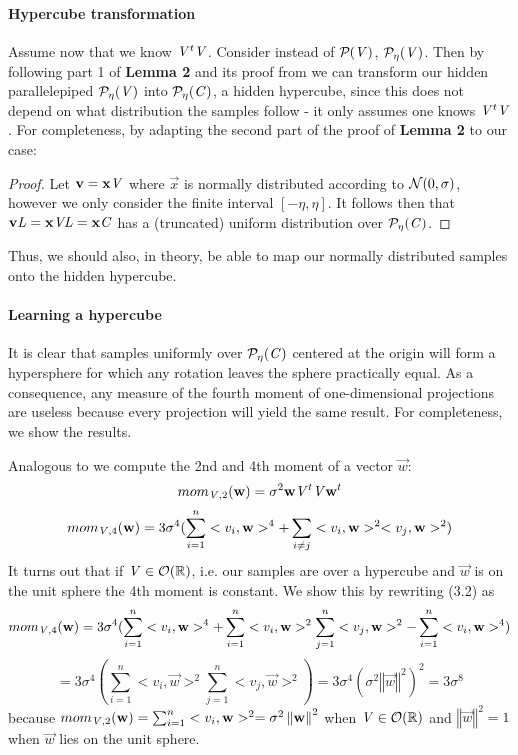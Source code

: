 \paragraph{Hypercube transformation}
Assume now that we know $\mat{V}^t \mat{V}$. Consider instead of $\PP{V}$, $\PP[\eta]{V}$.
Then by following part 1 of \textbf{Lemma 2} and its proof from \cite{NR09} we can transform our hidden parallelepiped $\PP[\eta]{V}$ into $\PP[\eta]{C}$, a hidden hypercube,
since this does not depend on what distribution the samples follow - it only assumes one knows $\mat{V}^t\mat{V}$.
For completeness, by adapting the second part of the proof of \textbf{Lemma 2} to our case: 
\begin{proof}
    Let $\vec{v} = \vec{x}\mat{V}$ where $\vec{x}$ is normally distributed according to $\normdist{0}{\sigma}$, however we only consider the finite interval $[-\eta,\eta]$.
    It follows then that $\vec{v}\mat{L} = \vec{x}\mat{V}\mat{L} = \vec{x}\mat{C}$ has a (truncated) uniform distribution over $\PP[\eta]{C}$.
\end{proof}
Thus, we should also, in theory, be able to map our normally distributed samples onto the hidden hypercube.

\paragraph{Learning a hypercube}
It is clear that samples uniformly over $\PP[\eta]{C}$ centered at the origin will form a hypersphere for which any rotation leaves the sphere practically equal. As a consequence, any measure of the fourth moment of one-dimensional projections are 
useless because every projection will yield the same result.
For completeness, we show the results.

Analogous to \cite{NR09} we compute the 2nd and 4th moment of a vector $\vec{w}$: \\
\begin{equation}
mom_{\mat{V}, 2}(\vec{w}) = \sigma^2 \vec{w}\mat{V}^t\mat{V}\vec{w}^t \\
\end{equation}
\begin{equation}
mom_{\mat{V}, 4}(\vec{w}) = 3 \sigma^4 (\sum_{i=1}^{n} <v_i, \vec{w}>^4 + \sum_{i \neq j} <v_i, \vec{w}>^2 <v_j, \vec{w}>^2)
\end{equation}
It turns out that if $\mat{V} \in \mathcal{O}(\bb{R})$, i.e. our samples are over a hypercube and $\vec{w}$ is on the unit sphere the 4th moment is constant. We show this by rewriting (3.2) as  
\[ mom_{\mat{V}, 4}(\vec{w}) = 3\sigma^4(\sum_{i=1}^n<v_i, \vec{w}>^4 + \sum_{i=1}^n <v_i, \vec{w}>^2 \sum_{j=1}^n <v_j, \vec{w}>^2 - \sum_{i=1}^n<v_i, \vec{w}>^4 )\]
\[ = 3\sigma^4(\sum_{i=1}^n <v_i, \vec{w}>^2 \sum_{j=1}^n <v_j, \vec{w}>^2) = 3\sigma^4(\sigma^2\left \Vert \vec{w} \right \Vert^2)^2 = 3\sigma^8\]
because $mom_{\mat{V}, 2}(\vec{w}) = \sum_{i=1}^n <v_i, \vec{w}>^2 = \sigma^2 \left \Vert \vec{w} \right \Vert^2$ when $\mat{V} \in \mathcal{O}(\bb{R})$ and $\left \Vert \vec{w} \right \Vert^2 = 1$ when $\vec{w}$ lies on the unit sphere.

